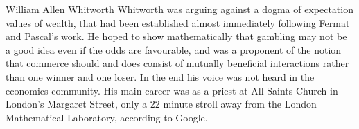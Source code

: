 \begin{history}{William Allen Whitworth}
Whitworth was arguing against a dogma of expectation values of wealth, that had 
been established almost immediately following Fermat and Pascal's work. He 
hoped to show mathematically that gambling may not be a good idea even if 
the odds are favourable, and was a 
proponent of the notion that commerce should and does
consist of mutually beneficial interactions rather than one winner and one loser. 
In the end his voice was not heard in the economics community. His main career was as a priest at All Saints Church in London's Margaret Street, only a 22 minute stroll away from the London 
Mathematical Laboratory, according to Google.
%
%
\end{history}
